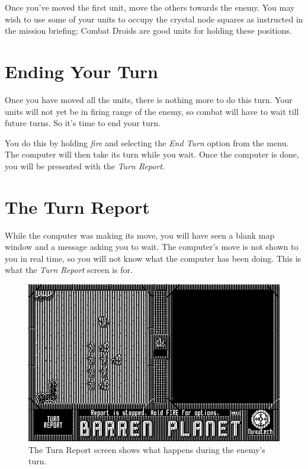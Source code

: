 Once you've moved the first unit, move the others towards the enemy. You may wish to use some of your units to occupy the crystal node squares as instructed in the mission briefing; Combat Droids are good units for holding these positions.

\section{Ending Your Turn}

\noindent
Once you have moved all the units, there is nothing more to do this turn. Your units will not yet be in firing range of the enemy, so combat will have to wait till future turns. So it's time to end your turn.

You do this by holding {\it fire} and selecting the {\it End Turn} option from the menu. The computer will then take its turn while you wait. Once the computer is done, you will be presented with the {\it Turn Report}.

\section{The Turn Report}

\noindent
While the computer was making its move, you will have seen a blank map window and a message asking you to wait. The computer's move is not shown to you in real time, so you will not know what the computer has been doing. This is what the {\it Turn Report} screen is for.

\begin{figure}[h]
  \includegraphics[width=\textwidth]{turn-report}
  \caption{The Turn Report screen shows what happens during the enemy's turn.}
\end{figure}

